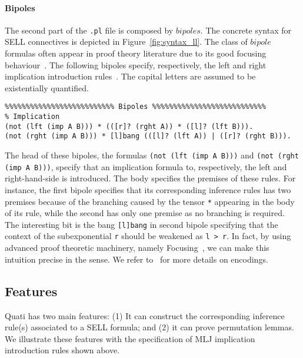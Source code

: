 \documentclass{llncs}
\begin{document}
\vspace{-2mm}

\paragraph{Bipoles}
%
The second part of the \texttt{.pl} file is composed by $bipoles$. The concrete syntax for SELL connectives
is depicted in Figure~\ref{fig:syntax_ll}. The class of $bipole$ formulas often
appear in proof theory literature due to its good focusing
behaviour~\cite{andreoli92jlc}. The following bipoles specify, 
respectively, the left and right implication introduction rules~\cite{nigam.jlc}. The capital 
letters are assumed to be existentially quantified.
\vspace{-1mm}

{\small
\begin{verbatim}
%%%%%%%%%%%%%%%%%%%%%%%%%% Bipoles %%%%%%%%%%%%%%%%%%%%%%%%%%%
% Implication
(not (lft (imp A B))) * (([r]? (rght A)) * ([l]? (lft B))).
(not (rght (imp A B))) * [l]bang (([l]? (lft A)) | ([r]? (rght B))).
\end{verbatim}
}

The head of these bipoles, the formulas \texttt{(not (lft (imp A B)))} and
\texttt{(not (rght (imp A B)))}, specify that an implication formula to, respectively, 
the left and right-hand-side is introduced. The body specifies the premises of these
rules. For instance, the first bipole specifies that its corresponding inference rules
has two premises because of the branching caused by the  
tensor \texttt{*} appearing in the body of its rule, while
the second has only one premise as no branching is required. 
The interesting bit is the bang \texttt{[l]bang} in second bipole specifying that the 
context of the subexponential \texttt{r} should be weakened as \texttt{l > r}.
In fact, by using advanced proof theoretic machinery, namely Focusing~\cite{andreoli92jlc}, 
we can make this intuition precise in the sense. We refer to~\cite{nigam.jlc} for more details
on encodings.


\subsection{Features}

Quati has two main features: (1) It can construct the corresponding inference rule(s) associated
to a SELL formula; and (2) it can prove permutation lemmas. We illustrate these features with 
the specification of MLJ implication introduction rules shown above.
\end{document}
